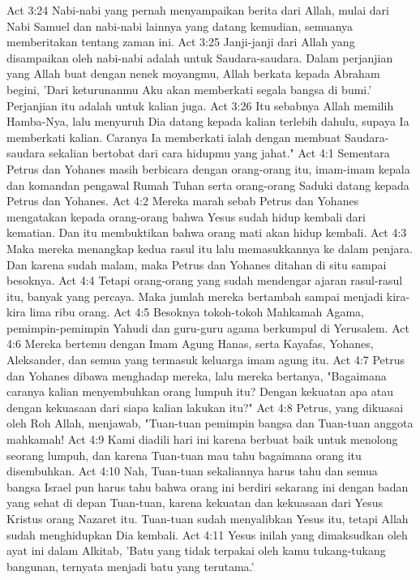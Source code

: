 Act 3:24  Nabi-nabi yang pernah menyampaikan berita dari Allah, mulai dari Nabi Samuel dan nabi-nabi lainnya yang datang kemudian, semuanya memberitakan tentang zaman ini.
Act 3:25  Janji-janji dari Allah yang disampaikan oleh nabi-nabi adalah untuk Saudara-saudara. Dalam perjanjian yang Allah buat dengan nenek moyangmu, Allah berkata kepada Abraham begini, 'Dari keturunanmu Aku akan memberkati segala bangsa di bumi.' Perjanjian itu adalah untuk kalian juga.
Act 3:26  Itu sebabnya Allah memilih Hamba-Nya, lalu menyuruh Dia datang kepada kalian terlebih dahulu, supaya Ia memberkati kalian. Caranya Ia memberkati ialah dengan membuat Saudara-saudara sekalian bertobat dari cara hidupmu yang jahat."
Act 4:1  Sementara Petrus dan Yohanes masih berbicara dengan orang-orang itu, imam-imam kepala dan komandan pengawal Rumah Tuhan serta orang-orang Saduki datang kepada Petrus dan Yohanes.
Act 4:2  Mereka marah sebab Petrus dan Yohanes mengatakan kepada orang-orang bahwa Yesus sudah hidup kembali dari kematian. Dan itu membuktikan bahwa orang mati akan hidup kembali.
Act 4:3  Maka mereka menangkap kedua rasul itu lalu memasukkannya ke dalam penjara. Dan karena sudah malam, maka Petrus dan Yohanes ditahan di situ sampai besoknya.
Act 4:4  Tetapi orang-orang yang sudah mendengar ajaran rasul-rasul itu, banyak yang percaya. Maka jumlah mereka bertambah sampai menjadi kira-kira lima ribu orang.
Act 4:5  Besoknya tokoh-tokoh Mahkamah Agama, pemimpin-pemimpin Yahudi dan guru-guru agama berkumpul di Yerusalem.
Act 4:6  Mereka bertemu dengan Imam Agung Hanas, serta Kayafas, Yohanes, Aleksander, dan semua yang termasuk keluarga imam agung itu.
Act 4:7  Petrus dan Yohanes dibawa menghadap mereka, lalu mereka bertanya, "Bagaimana caranya kalian menyembuhkan orang lumpuh itu? Dengan kekuatan apa atau dengan kekuasaan dari siapa kalian lakukan itu?"
Act 4:8  Petrus, yang dikuasai oleh Roh Allah, menjawab, "Tuan-tuan pemimpin bangsa dan Tuan-tuan anggota mahkamah!
Act 4:9  Kami diadili hari ini karena berbuat baik untuk menolong seorang lumpuh, dan karena Tuan-tuan mau tahu bagaimana orang itu disembuhkan.
Act 4:10  Nah, Tuan-tuan sekaliannya harus tahu dan semua bangsa Israel pun harus tahu bahwa orang ini berdiri sekarang ini dengan badan yang sehat di depan Tuan-tuan, karena kekuatan dan kekuasaan dari Yesus Kristus orang Nazaret itu. Tuan-tuan sudah menyalibkan Yesus itu, tetapi Allah sudah menghidupkan Dia kembali.
Act 4:11  Yesus inilah yang dimaksudkan oleh ayat ini dalam Alkitab, 'Batu yang tidak terpakai oleh kamu tukang-tukang bangunan, ternyata menjadi batu yang terutama.'
